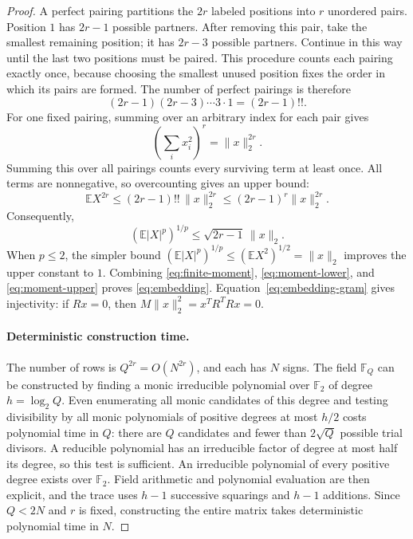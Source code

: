 \documentclass[10pt,a4paper]{amsart}
\newcommand{\E}{\mathbb E}
\newcommand{\F}{\mathbb F}
\begin{document}
\begin{proof}
A perfect pairing partitions the $2r$ labeled positions into $r$ unordered pairs. Position $1$ has $2r-1$ possible partners. After removing this pair, take the smallest remaining position; it has $2r-3$ possible partners. Continue in this way until the last two positions must be paired. This procedure counts each pairing exactly once, because choosing the smallest unused position fixes the order in which its pairs are formed. The number of perfect pairings is therefore
\[
 (2r-1)(2r-3)\cdots3\cdot1=(2r-1)!!.
\]
For one fixed pairing, summing over an arbitrary index for each pair gives
\[
 \left(\sum_i x_i^2\right)^r=\|x\|_2^{2r}.
\]
Summing this over all pairings counts every surviving term at least once. All terms are nonnegative, so overcounting gives an upper bound:
\[
 \E X^{2r}\le(2r-1)!!\,\|x\|_2^{2r}
 \le(2r-1)^r\|x\|_2^{2r}.
\]
Consequently,
\begin{equation}\label{eq:moment-upper}
 (\E|X|^p)^{1/p}\le\sqrt{2r-1}\,\|x\|_2.
\end{equation}
When $p\le2$, the simpler bound $(\E|X|^p)^{1/p}\le(\E X^2)^{1/2}=\|x\|_2$ improves the upper constant to $1$. Combining \eqref{eq:finite-moment}, \eqref{eq:moment-lower}, and \eqref{eq:moment-upper} proves \eqref{eq:embedding}. Equation~\eqref{eq:embedding-gram} gives injectivity: if $Rx=0$, then $M\|x\|_2^2=x^TR^TRx=0$.

\paragraph{Deterministic construction time.}
The number of rows is $Q^{2r}=O(N^{2r})$, and each has $N$ signs. The field $\F_Q$ can be constructed by finding a monic irreducible polynomial over $\F_2$ of degree $h=\log_2Q$. Even enumerating all monic candidates of this degree and testing divisibility by all monic polynomials of positive degrees at most $h/2$ costs polynomial time in $Q$: there are $Q$ candidates and fewer than $2\sqrt Q$ possible trial divisors. A reducible polynomial has an irreducible factor of degree at most half its degree, so this test is sufficient. An irreducible polynomial of every positive degree exists over $\F_2$. Field arithmetic and polynomial evaluation are then explicit, and the trace uses $h-1$ successive squarings and $h-1$ additions. Since $Q<2N$ and $r$ is fixed, constructing the entire matrix takes deterministic polynomial time in $N$.
\end{proof}
\end{document}
